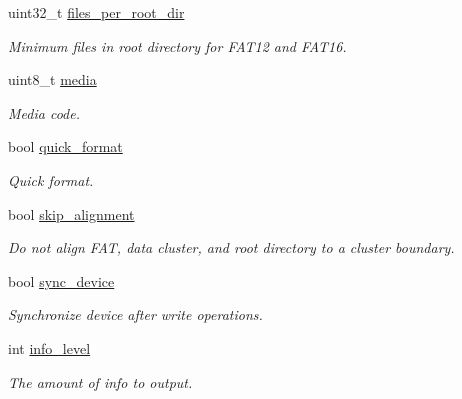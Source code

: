 \begin{DoxyCompactItemize}
uint32\+\_\+t \mbox{\hyperlink{structmsdos__format__request__param__t_a83fd74a2ff3fbb33a9ec3cff997ea09e}{files\+\_\+per\+\_\+root\+\_\+dir}}
\begin{DoxyCompactList}\small\item\em Minimum files in root directory for F\+A\+T12 and F\+A\+T16. \end{DoxyCompactList}\item 
uint8\+\_\+t \mbox{\hyperlink{structmsdos__format__request__param__t_af0f8cb4b8e09936ad7cbf1c7b41b7db1}{media}}
\begin{DoxyCompactList}\small\item\em Media code. \end{DoxyCompactList}\item 
bool \mbox{\hyperlink{structmsdos__format__request__param__t_a8a7f584248fed36d12e58ea0ed4b4df3}{quick\+\_\+format}}
\begin{DoxyCompactList}\small\item\em Quick format. \end{DoxyCompactList}\item 
\mbox{\label{structmsdos__format__request__param__t_a893ea4ef60687dc565123d0aee973cd7}} 
bool \mbox{\hyperlink{structmsdos__format__request__param__t_a893ea4ef60687dc565123d0aee973cd7}{skip\+\_\+alignment}}
\begin{DoxyCompactList}\small\item\em Do not align F\+AT, data cluster, and root directory to a cluster boundary. \end{DoxyCompactList}\item 
\mbox{\label{structmsdos__format__request__param__t_ac51d903ed97db9411121aeb0a4caaf51}} 
bool \mbox{\hyperlink{structmsdos__format__request__param__t_ac51d903ed97db9411121aeb0a4caaf51}{sync\+\_\+device}}
\begin{DoxyCompactList}\small\item\em Synchronize device after write operations. \end{DoxyCompactList}\item 
\mbox{\label{structmsdos__format__request__param__t_a3aa0b3ff2ac910bb48b69dac20943acb}} 
int \mbox{\hyperlink{structmsdos__format__request__param__t_a3aa0b3ff2ac910bb48b69dac20943acb}{info\+\_\+level}}
\begin{DoxyCompactList}\small\item\em The amount of info to output. \end{DoxyCompactList}\end{DoxyCompactItemize}


